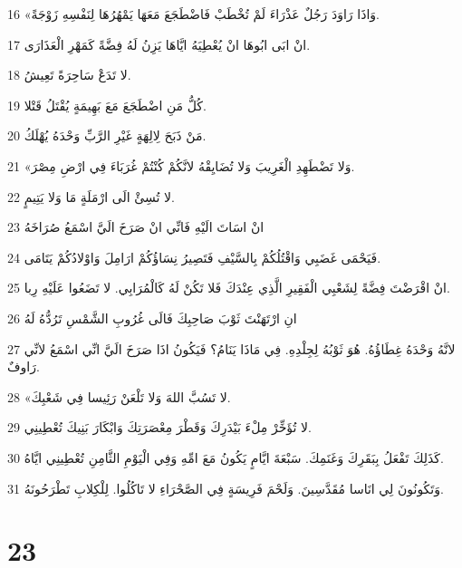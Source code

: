 \par 16 «وَاذَا رَاوَدَ رَجُلٌ عَذْرَاءَ لَمْ تُخْطَبْ فَاضْطَجَعَ مَعَهَا يَمْهُرُهَا لِنَفْسِهِ زَوْجَةً.
\par 17 انْ ابَى ابُوهَا انْ يُعْطِيَهُ ايَّاهَا يَزِنُ لَهُ فِضَّةً كَمَهْرِ الْعَذَارَى.
\par 18 لا تَدَعْ سَاحِرَةً تَعِيشُ.
\par 19 كُلُّ مَنِ اضْطَجَعَ مَعَ بَهِيمَةٍ يُقْتَلُ قَتْلا.
\par 20 مَنْ ذَبَحَ لِالِهَةٍ غَيْرِ الرَّبِّ وَحْدَهُ يُهْلَكُ.
\par 21 «وَلا تَضْطَهِدِ الْغَرِيبَ وَلا تُضَايِقْهُ لانَّكُمْ كُنْتُمْ غُرَبَاءَ فِي ارْضِ مِصْرَ.
\par 22 لا تُسِئْ الَى ارْمَلَةٍ مَا وَلا يَتِيمٍ.
\par 23 انْ اسَاتَ الَيْهِ فَانِّي انْ صَرَخَ الَيَّ اسْمَعُ صُرَاخَهُ
\par 24 فَيَحْمَى غَضَبِي وَاقْتُلُكُمْ بِالسَّيْفِ فَتَصِيرُ نِسَاؤُكُمْ ارَامِلَ وَاوْلادُكُمْ يَتَامَى.
\par 25 انْ اقْرَضْتَ فِضَّةً لِشَعْبِي الْفَقِيرِ الَّذِي عِنْدَكَ فَلا تَكُنْ لَهُ كَالْمُرَابِي. لا تَضَعُوا عَلَيْهِ رِبا.
\par 26 انِ ارْتَهَنْتَ ثَوْبَ صَاحِبِكَ فَالَى غُرُوبِ الشَّمْسِ تَرُدُّهُ لَهُ
\par 27 لانَّهُ وَحْدَهُ غِطَاؤُهُ. هُوَ ثَوْبُهُ لِجِلْدِهِ. فِي مَاذَا يَنَامُ؟ فَيَكُونُ اذَا صَرَخَ الَيَّ انِّي اسْمَعُ لانِّي رَاوفٌ.
\par 28 «لا تَسُبَّ اللهَ وَلا تَلْعَنْ رَئِيسا فِي شَعْبِكَ.
\par 29 لا تُؤَخِّرْ مِلْءَ بَيْدَرِكَ وَقَطْرَ مِعْصَرَتِكَ وَابْكَارَ بَنِيكَ تُعْطِينِي.
\par 30 كَذَلِكَ تَفْعَلُ بِبَقَرِكَ وَغَنَمِكَ. سَبْعَةَ ايَّامٍ يَكُونُ مَعَ امِّهِ وَفِي الْيَوْمِ الثَّامِنِ تُعْطِينِي ايَّاهُ.
\par 31 وَتَكُونُونَ لِي انَاسا مُقَدَّسِينَ. وَلَحْمَ فَرِيسَةٍ فِي الصَّحْرَاءِ لا تَاكُلُوا. لِلْكِلابِ تَطْرَحُونَهُ.

\chapter{23}

